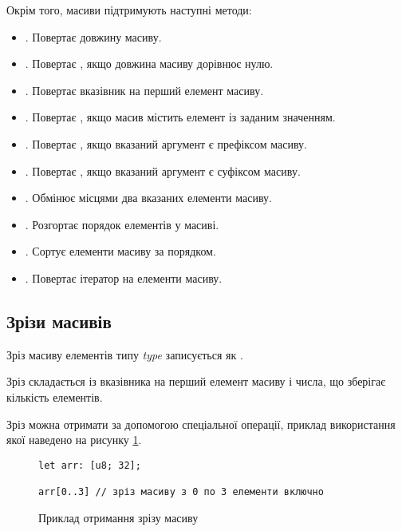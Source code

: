 \documentclass[main.tex]{subfiles}
\begin{document}
Окрім того, масиви підтримують наступні методи:
\begin{itemize}
\item {}. Повертає довжину масиву.
\item {}. Повертає , якщо довжина масиву дорівнює нулю.
\item {}. Повертає вказівник на перший елемент масиву.
\item {}. Повертає , якщо масив містить елемент із заданим значенням.
\item {}. Повертає , якщо вказаний аргумент є префіксом масиву.
\item {}. Повертає , якщо вказаний аргумент є суфіксом масиву.
\item {}. Обмінює місцями два вказаних елементи масиву.
\item {}. Розгортає порядок елементів у масиві.
\item {}. Сортує елементи масиву за порядком.
\item {}. Повертає ітератор на елементи масиву.
\end{itemize}

\FloatBarrier
\subsection{Зрізи масивів}
Зріз масиву\cite{array-slicing} елементів типу \emph{type} записується як .

Зріз складається із вказівника на перший елемент масиву і числа, що зберігає кількість елементів.

Зріз можна отримати за допомогою спеціальної операції, приклад використання якої наведено на рисунку \ref{lang:slicing}.

\begin{figure}[h]
  \centering
  \begin{verbatim}
let arr: [u8; 32];

arr[0..3] // зріз масиву з 0 по 3 елементи включно
  \end{verbatim}
  \caption{Приклад отримання зрізу масиву}
  \label{lang:slicing}
\end{figure}
\end{document}
